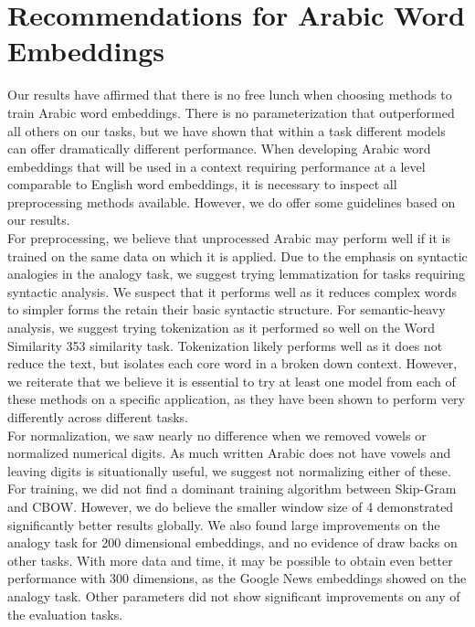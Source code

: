 \section{Recommendations for Arabic Word Embeddings}
\label{sec:recommendations}

Our results have affirmed that there is no free lunch when choosing methods to train Arabic word embeddings. There is no parameterization that outperformed all others on our tasks, but we have shown that within a task different models can offer dramatically different performance. When developing Arabic word embeddings that will be used in a context requiring performance at a level comparable to English word embeddings, it is necessary to inspect all preprocessing methods available. However, we do offer some guidelines based on our results.
\\
For preprocessing, we believe that unprocessed Arabic may perform well if it is trained on the same data on which it is applied. Due to the emphasis on syntactic analogies in the analogy task, we suggest trying lemmatization for tasks requiring syntactic analysis. We suspect that it performs well as it reduces complex words to simpler forms the retain their basic syntactic structure. For semantic-heavy analysis, we suggest trying tokenization as it performed so well on the Word Similarity 353 similarity task. Tokenization likely performs well as it does not reduce the text, but isolates each core word in a broken down context. However, we reiterate that we believe it is essential to try at least one model from each of these methods on a specific application, as they have been shown to perform very differently across different tasks.
\\
For normalization, we saw nearly no difference when we removed vowels or normalized numerical digits. As much written Arabic does not have vowels and leaving digits is situationally useful, we suggest not normalizing either of these. For training, we did not find a dominant training algorithm between Skip-Gram and CBOW. However, we do believe the smaller window size of 4 demonstrated significantly better results globally. We also found large improvements on the analogy task for 200 dimensional embeddings, and no evidence of draw backs on other tasks. With more data and time, it may be possible to obtain even better performance with 300 dimensions, as the Google News embeddings showed on the analogy task. Other parameters did not show significant improvements on any of the evaluation tasks.